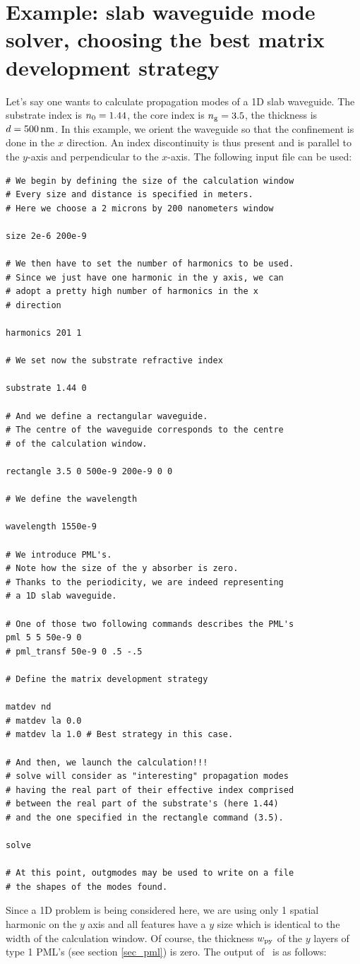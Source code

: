 \section[Slab waveguide and matrix developments]{Example: slab waveguide mode solver, choosing the best matrix development strategy}
\label{sec_guide1D}
Let's say one wants to calculate propagation modes of a 1D slab waveguide. The substrate index is $n_\mathrm{0}=1.44$, the core index is $n_\mathrm{g}=3.5$, the thickness is $d=500\,\mathrm{nm}$. In this example, we orient the waveguide so that the confinement is done in the $x$ direction. An index discontinuity is thus present and is parallel to the $y$-axis and perpendicular to the $x$-axis. The following input file can be used:
\begin{lstlisting} 
# We begin by defining the size of the calculation window
# Every size and distance is specified in meters.
# Here we choose a 2 microns by 200 nanometers window

size 2e-6 200e-9

# We then have to set the number of harmonics to be used.
# Since we just have one harmonic in the y axis, we can
# adopt a pretty high number of harmonics in the x
# direction

harmonics 201 1

# We set now the substrate refractive index

substrate 1.44 0

# And we define a rectangular waveguide.
# The centre of the waveguide corresponds to the centre
# of the calculation window.

rectangle 3.5 0 500e-9 200e-9 0 0

# We define the wavelength

wavelength 1550e-9

# We introduce PML's.
# Note how the size of the y absorber is zero.
# Thanks to the periodicity, we are indeed representing
# a 1D slab waveguide.

# One of those two following commands describes the PML's
pml 5 5 50e-9 0
# pml_transf 50e-9 0 .5 -.5

# Define the matrix development strategy

matdev nd
# matdev la 0.0
# matdev la 1.0 # Best strategy in this case. 

# And then, we launch the calculation!!!
# solve will consider as "interesting" propagation modes
# having the real part of their effective index comprised
# between the real part of the substrate's (here 1.44) 
# and the one specified in the rectangle command (3.5). 

solve

# At this point, outgmodes may be used to write on a file
# the shapes of the modes found.
\end{lstlisting}
Since a 1D problem is being considered here, we are using only 1 spatial harmonic on the $y$ axis and all features have a $y$ size which is identical to the width of the calculation window. Of course, the thickness $w_\mathrm{py}$ of the $y$ layers of type 1 PML's (see section \ref{sec_pml}) is zero. The output of \afmm\ is as follows:

